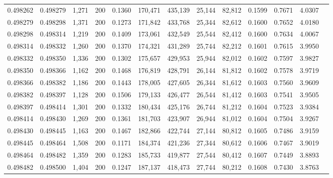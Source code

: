 \begin{tabular}{rrrrrrrrrrrrr}
0.498262 & 0.498279 & 1,271 & 200 &                                     0.1360 & 170,471 & 435,139 &  25,144 &  82,812 & 0.1599 & 0.7671 & 4.0307 \\
0.498279 & 0.498298 & 1,371 & 200 &                                     0.1273 & 171,842 & 433,768 &  25,344 &  82,612 & 0.1600 & 0.7652 & 4.0180 \\
0.498298 & 0.498314 & 1,219 & 200 &                                     0.1409 & 173,061 & 432,549 &  25,544 &  82,412 & 0.1600 & 0.7634 & 4.0067 \\
0.498314 & 0.498332 & 1,260 & 200 &                                     0.1370 & 174,321 & 431,289 &  25,744 &  82,212 & 0.1601 & 0.7615 & 3.9950 \\
0.498332 & 0.498350 & 1,336 & 200 &                                     0.1302 & 175,657 & 429,953 &  25,944 &  82,012 & 0.1602 & 0.7597 & 3.9827 \\
0.498350 & 0.498366 & 1,162 & 200 &                                     0.1468 & 176,819 & 428,791 &  26,144 &  81,812 & 0.1602 & 0.7578 & 3.9719 \\
0.498366 & 0.498382 & 1,186 & 200 &                                     0.1443 & 178,005 & 427,605 &  26,344 &  81,612 & 0.1603 & 0.7560 & 3.9609 \\
0.498382 & 0.498397 & 1,128 & 200 &                                     0.1506 & 179,133 & 426,477 &  26,544 &  81,412 & 0.1603 & 0.7541 & 3.9505 \\
0.498397 & 0.498414 & 1,301 & 200 &                                     0.1332 & 180,434 & 425,176 &  26,744 &  81,212 & 0.1604 & 0.7523 & 3.9384 \\
0.498414 & 0.498430 & 1,269 & 200 &                                     0.1361 & 181,703 & 423,907 &  26,944 &  81,012 & 0.1604 & 0.7504 & 3.9267 \\
0.498430 & 0.498445 & 1,163 & 200 &                                     0.1467 & 182,866 & 422,744 &  27,144 &  80,812 & 0.1605 & 0.7486 & 3.9159 \\
0.498445 & 0.498464 & 1,508 & 200 &                                     0.1171 & 184,374 & 421,236 &  27,344 &  80,612 & 0.1606 & 0.7467 & 3.9019 \\
0.498464 & 0.498482 & 1,359 & 200 &                                     0.1283 & 185,733 & 419,877 &  27,544 &  80,412 & 0.1607 & 0.7449 & 3.8893 \\
0.498482 & 0.498500 & 1,404 & 200 &                                     0.1247 & 187,137 & 418,473 &  27,744 &  80,212 & 0.1608 & 0.7430 & 3.8763 \\

\end{tabular}
